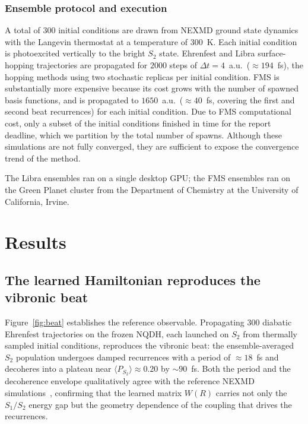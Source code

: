 \documentclass[11pt]{article}
\begin{document}
\subsubsection{Ensemble protocol and execution}
A total of $300$ initial conditions are drawn from NEXMD ground state dynamics with the Langevin thermostat at a temperature of $300$~K. Each initial condition is photoexcited vertically to the bright $S_2$ state. Ehrenfest and Libra surface-hopping trajectories are propagated for $2000$ steps of $\Delta t = 4$~a.u.\ ($\approx\!194$~fs), the hopping methods using two stochastic replicas per initial condition. FMS is substantially more expensive because its cost grows with the number of spawned basis functions, and is propagated to $1650$~a.u.\ ($\approx\!40$~fs, covering the first and second beat recurrences) for each initial condition. Due to FMS computational cost, only a subset of the initial conditions finished in time for the report deadline, which we partition by the total number of spawns. Although these simulations are not fully converged, they are sufficient to expose the convergence trend of the method.

The Libra ensembles ran on a single desktop GPU; the FMS ensembles ran on the Green Planet cluster from the Department of Chemistry at the University of California, Irvine.

\section{Results}
\label{sec:results}
\subsection{The learned Hamiltonian reproduces the vibronic beat}

Figure~\ref{fig:beat} establishes the reference observable. Propagating $300$ diabatic Ehrenfest trajectories on the frozen NQDH, each launched on $S_2$ from thermally sampled initial conditions, reproduces the vibronic beat: the ensemble-averaged $S_2$ population undergoes damped recurrences with a period of $\approx\!18$~fs and decoheres into a plateau near $\langle P_{S_2}\rangle \approx 0.20$ by $\sim\!90$~fs. Both the period and the decoherence envelope qualitatively agree with the reference NEXMD simulations~\cite{freixas2020vibronic,keefer2021monitoring}, confirming that the learned matrix $W(R)$ carries not only the $S_1/S_2$ energy gap but the geometry dependence of the coupling that drives the recurrences.
\end{document}
